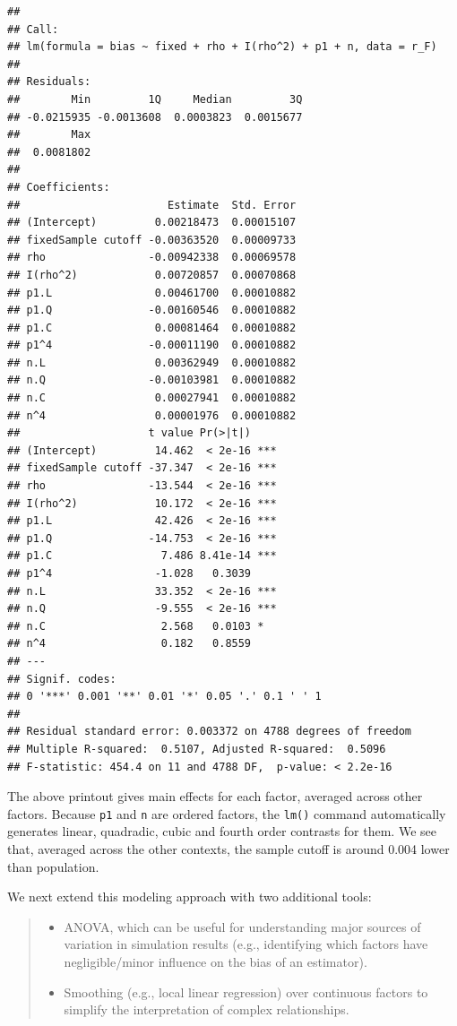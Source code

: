 \documentclass[
]{book}
\providecommand{\tightlist}{%
  \setlength{\itemsep}{0pt}\setlength{\parskip}{0pt}}
\begin{document}
\begin{verbatim}
## 
## Call:
## lm(formula = bias ~ fixed + rho + I(rho^2) + p1 + n, data = r_F)
## 
## Residuals:
##        Min         1Q     Median         3Q 
## -0.0215935 -0.0013608  0.0003823  0.0015677 
##        Max 
##  0.0081802 
## 
## Coefficients:
##                       Estimate  Std. Error
## (Intercept)         0.00218473  0.00015107
## fixedSample cutoff -0.00363520  0.00009733
## rho                -0.00942338  0.00069578
## I(rho^2)            0.00720857  0.00070868
## p1.L                0.00461700  0.00010882
## p1.Q               -0.00160546  0.00010882
## p1.C                0.00081464  0.00010882
## p1^4               -0.00011190  0.00010882
## n.L                 0.00362949  0.00010882
## n.Q                -0.00103981  0.00010882
## n.C                 0.00027941  0.00010882
## n^4                 0.00001976  0.00010882
##                    t value Pr(>|t|)    
## (Intercept)         14.462  < 2e-16 ***
## fixedSample cutoff -37.347  < 2e-16 ***
## rho                -13.544  < 2e-16 ***
## I(rho^2)            10.172  < 2e-16 ***
## p1.L                42.426  < 2e-16 ***
## p1.Q               -14.753  < 2e-16 ***
## p1.C                 7.486 8.41e-14 ***
## p1^4                -1.028   0.3039    
## n.L                 33.352  < 2e-16 ***
## n.Q                 -9.555  < 2e-16 ***
## n.C                  2.568   0.0103 *  
## n^4                  0.182   0.8559    
## ---
## Signif. codes:  
## 0 '***' 0.001 '**' 0.01 '*' 0.05 '.' 0.1 ' ' 1
## 
## Residual standard error: 0.003372 on 4788 degrees of freedom
## Multiple R-squared:  0.5107, Adjusted R-squared:  0.5096 
## F-statistic: 454.4 on 11 and 4788 DF,  p-value: < 2.2e-16
\end{verbatim}

The above printout gives main effects for each factor, averaged across other factors.
Because \texttt{p1} and \texttt{n} are ordered factors, the \texttt{lm()} command automatically generates linear, quadradic, cubic and fourth order contrasts for them.
We see that, averaged across the other contexts, the sample cutoff is around 0.004 lower than population.

We next extend this modeling approach with two additional tools:

\begin{quote}
\begin{itemize}
\tightlist
\item
  ANOVA, which can be useful for understanding major sources of variation in simulation results (e.g., identifying which factors have negligible/minor influence on the bias of an estimator).
\item
  Smoothing (e.g., local linear regression) over continuous factors to simplify the interpretation of complex relationships.
\end{itemize}
\end{quote}
\end{document}
